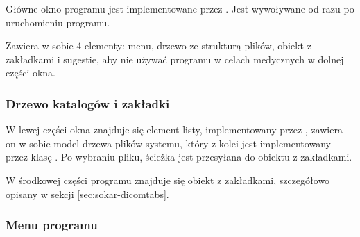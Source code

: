 \label{sec:sokar-window}

\par
Główne okno programu jest implementowane przez .
Jest wywoływane od razu po uruchomieniu programu.
\par
Zawiera w sobie 4 elementy: menu, drzewo ze strukturą plików, obiekt z zakładkami i sugestie, aby nie używać programu w celach medycznych w dolnej części okna.

\subsubsection{Drzewo katalogów i zakładki}

\par
W lewej części okna znajduje się element listy, implementowany przez , zawiera on w sobie model drzewa plików systemu, który z kolei jest implementowany przez klasę .
Po wybraniu pliku, ścieżka jest przesyłana do obiektu z zakładkami.
\par
W środkowej części programu znajduje się obiekt z zakładkami, szczegółowo opisany w sekcji \ref{sec:sokar-dicomtabs}.

\subsubsection{Menu programu}
\label{sec:sokar-window-menu}

